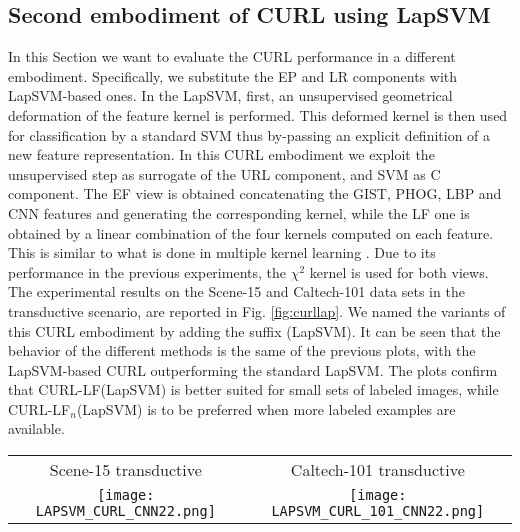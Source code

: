 \documentclass[journal,11pt]{IEEEtran}
\newcommand{\ADD}[1]{#1}
\newcommand{\emb}{embodiment}
\newcommand{\curllaplf}{CURL-LF(LapSVM)}
\newcommand{\curllaplfn}{CURL-LF$_n$(LapSVM)}
\begin{document}
\subsection{Second \emb{ }of CURL using LapSVM}
\label{subsec:curllap}
\ADD{
In this Section we want to evaluate the CURL performance in a different \emb. Specifically, we substitute the EP and LR components with LapSVM-based ones. 
%
In the LapSVM, first, an unsupervised geometrical deformation of the feature kernel is performed. This deformed kernel is then used for classification by a standard SVM thus by-passing an explicit definition of a new feature representation. In this CURL \emb{ }we exploit the unsupervised step as surrogate of the URL component, and SVM as C component. 
%
The EF view is obtained concatenating the GIST, PHOG, LBP and CNN features and generating the corresponding kernel, while the LF one is obtained by a linear combination of the four kernels computed on each feature. This is similar to what is done in multiple kernel learning \cite{gonen2011multiple}. Due to its performance in the previous experiments, the $\chi^2$ kernel is used for both views. 
%
The experimental results on the Scene-15 and Caltech-101 data sets in the transductive scenario, are reported in Fig. \ref{fig:curllap}. We named the variants of this CURL \emb{ }by adding the suffix (LapSVM). It can be seen that the behavior of the different methods is the same of the previous plots, with the LapSVM-based CURL outperforming the standard LapSVM. The plots confirm that \curllaplf{ }is better suited for small sets of labeled images, while \curllaplfn{ }is to be preferred when more labeled examples are available.}


\begin{figure*}[!htbp]%
\centering
\begin{tabular}{cc}
\footnotesize{Scene-15 transductive} & \footnotesize{Caltech-101 transductive}\\
\texttt{[image: LAPSVM\_CURL\_CNN22.png]} &
\texttt{[image: LAPSVM\_CURL\_101\_CNN22.png]} \\
\end{tabular}
\caption{Mean Average Precision (MAP) varying the number of labeled images per class, obtained on the Scene-15 data set (left), and on the Caltech-101 data set (right). Results are obtained using GIST, PHOG, LBP and CNN features.}%
\label{fig:curllap}%
\end{figure*}
\end{document}
